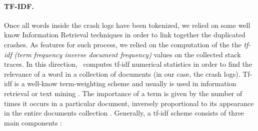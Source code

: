 \paragraph{TF-IDF.} 
Once all words inside the crash logs have been tokenized, we relied on some well know Information Retrieval techniques in order to link together the duplicated crashes.
As features for such process, we relied on the computation of the the \textit{tf-idf} \textit{(term frequency inverse document frequency)} values on the collected stack traces. 
In this direction, \toolname\ computes tf-idf numerical statistics in order to find the relevance of a word in a collection of documents (in our case, the crash logs). Tf-idf is a well-know term-weighting scheme and usually is used in information retrieval or text mining \cite{tfidf}. %
The importance of a term is given by the number of times it occurs in a particular document, inversely proportional to its appearance in the entire documents collection \cite{campbell}. 
Generally, a tf-idf scheme consists of three main components \cite{tfidfsimilarity}: 
